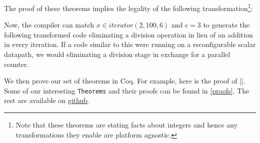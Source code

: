 The proof of these theorems implies the legality of the following
transformation\footnote{Note that these theorems are stating facts about
  integers and hence any transformations they enable are platform
  agnostic.}:

\begin{Shaded}
\begin{Highlighting}[]
 \OperatorTok{(}\OperatorTok{=} \OperatorTok{;}\OperatorTok{\textless{}=} \OperatorTok{;}\OperatorTok{+=} \OperatorTok{)} \OperatorTok{\{}
\OperatorTok{=}\OperatorTok{/}\OperatorTok{;}
\OperatorTok{(}\OperatorTok{);}
\OperatorTok{\}}
\end{Highlighting}
\end{Shaded}

Now, the compiler can match \(x \in iterator(2, 100, 6)\) and \(c = 3\)
to generate the following transformed code eliminating a division
operation in lieu of an addition in every iteration. If a code similar
to this were running on a reconfigurable scalar datapath, we would
eliminating a division stage in exchange for a parallel counter.

\begin{Shaded}
\begin{Highlighting}[]
 \OperatorTok{(}\OperatorTok{=} \OperatorTok{,}\OperatorTok{=} \OperatorTok{;}\OperatorTok{\textless{}=} \OperatorTok{;}\OperatorTok{+=} \OperatorTok{,}\OperatorTok{+=} \OperatorTok{)} \OperatorTok{\{}
\OperatorTok{(}\OperatorTok{);}
\OperatorTok{\}}
\end{Highlighting}
\end{Shaded}

We then prove our set of theorems in Coq. For example, here is the proof
of \VERB||. Some of our
interesting \texttt{Theorems} and their proofs can be found in
\autoref{proofs}. The rest are available on
\href{https://gitfront.io/r/user-8813495/NSEjGqe31hHN/cs6245proj/}{github}.

